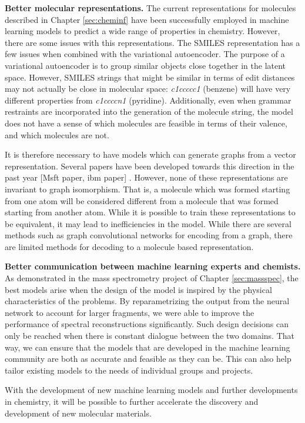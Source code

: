 \textbf{Better molecular representations.}
The current representations for molecules described in Chapter \ref{sec:cheminf} have been successfully employed in machine learning models
to predict a wide range of properties in chemistry.
However, there are some issues with this representations.
The SMILES representation has a few issues when combined with the variational autoencoder.
The purpose of a variational autoencoder is to group similar objects close together in the latent space.
However, SMILES strings that might be similar in terms of edit distances may not actually be close in molecular space:
\textit{c1ccccc1} (benzene) will have very different properties from \textit{c1ccccn1} (pyridine).
Additionally, even when grammar restraints are incorporated into the generation of the molecule string\cite{kusner2017grammar},
the model does not have a sense of which molecules are feasible in terms of their valence, and which molecules are not.

It is therefore necessary to have models which can generate graphs from a vector representation.
Several papers have been developed towards this direction in the past year \cite{} [Msft paper, ibm paper] \cite{jin2018junction}.
However, none of these representations are invariant to graph isomorphism. That is, a molecule which was
formed starting from one atom will be considered different from a molecule that was formed starting from another atom.
While it is possible to train these representations to be equivalent, it may lead to inefficiencies in the model.
While there are several methods such as graph convolutional networks for encoding from a graph,
there are limited methods for decoding to a molecule based representation.

\textbf{Better communication between machine learning experts and chemists.}
As demonstrated in the mass spectrometry project of Chapter \ref{sec:massspec},
the best models arise when the design of the model is inspired by the physical characteristics of the problems.
By reparametrizing the output from the neural network to account for larger fragments, we were able to improve the
performance of spectral reconstructions significantly.
Such design decisions can only be reached when there is constant dialogue between the two domains.
That way, we can ensure that the models that are developed in the machine learning community are both as accurate
and feasible as they can be.
This can also help tailor existing models to the needs of individual groups and projects.

With the development of new machine learning models and further developments in chemistry,
it will be possible to further accelerate the discovery and development of new molecular materials.
